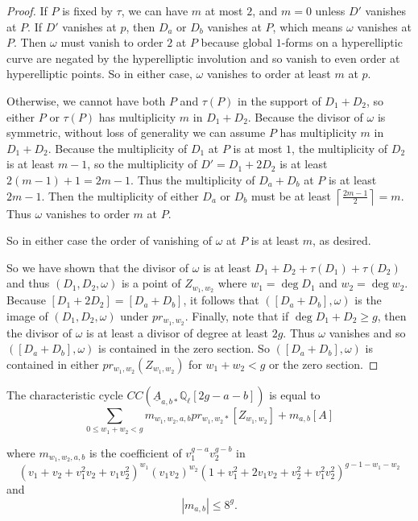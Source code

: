 \begin{proof}
If $P$ is fixed by $\tau$, we can have $m$ at most $2$, and $m=0$ unless $D'$ vanishes at $P$. If $D'$ vanishes at $p$, then $D_a$ or $D_b$ vanishes at $P$, which means $\omega$ vanishes at $P$. Then $\omega$ must vanish to order $2$ at $P$ because global $1$-forms on a hyperelliptic curve are negated by the hyperelliptic involution and so vanish to even order at hyperelliptic points. So in either case, $\omega$ vanishes to order at least $m$ at $p$.

Otherwise, we cannot have both $P$ and $\tau(P)$ in the support of $D_1+D_2$, so either $P$ or $\tau(P)$ has multiplicity $m$ in $D_1+D_2$. Because the divisor of $\omega$ is symmetric, without loss of generality we can assume $P$ has multiplicity $m$ in $D_1+D_2$. Because the multiplicity of $D_1$ at $P$ is at most $1$, the multiplicity of $D_2$ is at least $m-1$, so the multiplicity of $D' = D_1+2 D_2$ is at least $2(m-1)+1=2m-1$. Thus the multiplicity of $D_a+D_b$ at $P$ is at least $2m-1$. Then the multiplicity of either $D_a$ or $D_b$ must be at least $\left\lceil \frac{2m-1}{2} \right\rceil =m$. Thus $\omega$ vanishes to order $m$ at $P$.

So in either case the order of vanishing of $\omega$ at $P$ is at least $m$, as desired.

So we have shown that the divisor of $\omega$ is at least $D_1+ D_2 + \tau(D_1) + \tau(D_2) $ and thus $(D_1,D_2, \omega)$ is a point of $Z_{w_1, w_2}$ where $w_1 = \deg D_1$ and $w_2 = \deg w_2$. Because $[D_1 +2D_2 ]= [D_a+D_b]$, it follows that  $( [D_a+ D_b] ,\omega) $ is the image of $(D_1,D_2, \omega)$ under $ pr_{w_1,w_2 }$.  Finally, note that if $\deg D_1 + D_2 \geq g$, then the divisor of $\omega$ is at least a divisor of degree at least $2g$. Thus $\omega$ vanishes and so $([D_a+D_b], \omega)$ is contained in the zero section. So $([D_a+D_b],\omega)$ is contained in either $pr_{w_1,w_2} (Z_{w_1,w_2})$ for $w_1+w_2<g$ or the zero section.

\end{proof}


\begin{lemma}
\notready\label{ts-smooth-cc} The characteristic cycle $CC ( \underline{A}_{a,b *} \mathbb Q_\ell [ 2g-a-b] )$ is equal to \[ \sum_{0 \leq w_1+ w_2 < g} m_{w_1,w_2,a,b}  pr_{w_1,w_2 *} [ Z_{w_1,w_2} ]  + m_{a,b} [ A]  \]


where $m_{w_1,w_2,a,b}$ is the coefficient of $v_1^{g-a} v_2^{g-b}$ in  \[ (v_1+ v_2+ v_1^2 v_2 + v_1 v_2^2 )^{w_1} (v_1v_2)^{w_2} ( 1  + v_1^2 + 2v_1 v_2 + v_2^2 + v_1^2 v_2^2 )^{g-1-w_1 -w_2} \]
and \[ |m_{a,b} | \leq 8^g .\]

 \end{lemma}

